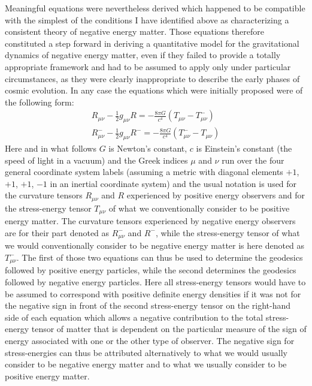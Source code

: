 \documentclass[notitlepage,12pt]{report}
\begin{document}
Meaningful equations were nevertheless derived which happened to be compatible with the simplest of the conditions I have identified above as characterizing a consistent theory of negative energy matter. Those equations therefore constituted a step forward in deriving a quantitative model for the gravitational dynamics of negative energy matter, even if they failed to provide a totally appropriate framework and had to be assumed to apply only under particular circumstances, as they were clearly inappropriate to describe the early phases of cosmic evolution. In any case the equations which were initially proposed were of the following form:
\begin{eqnarray}\label{eq:2.1}
R_{\mu\nu}-\frac{1}{2}g_{\mu\nu}R=-\frac{8\pi G}{c^4} (T_{\mu\nu}-T^-_{\mu\nu}) \\
R^-_{\mu\nu}-\frac{1}{2}g_{\mu\nu}R^-=-\frac{8\pi G}{c^4} (T^-_{\mu\nu}-T_{\mu\nu}) \nonumber
\end{eqnarray}
Here and in what follows $G$ is Newton's constant, $c$ is Einstein's constant (the speed of light in a vacuum) and the Greek indices $\mu$ and $\nu$ run over the four general coordinate system labels (assuming a metric with diagonal elements $+1$, $+1$, $+1$, $-1$ in an inertial coordinate system) and the usual notation is used for the curvature tensors $R_{\mu\nu}$ and $R$ experienced by positive energy observers and for the stress-energy tensor $T_{\mu\nu}$ of what we conventionally consider to be positive energy matter. The curvature tensors experienced by negative energy observers are for their part denoted as $R^-_{\mu\nu}$ and $R^-$, while the stress-energy tensor of what we would conventionally consider to be negative energy matter is here denoted as $T^-_{\mu\nu}$. The first of those two equations can thus be used to determine the geodesics followed by positive energy particles, while the second determines the geodesics followed by negative energy particles. Here all stress-energy tensors would have to be assumed to correspond with positive definite energy densities if it was not for the negative sign in front of the second stress-energy tensor on the right-hand side of each equation which allows a negative contribution to the total stress-energy tensor of matter that is dependent on the particular measure of the sign of energy associated with one or the other type of observer. The negative sign for stress-energies can thus be attributed alternatively to what we would usually consider to be negative energy matter and to what we usually consider to be positive energy matter.
\end{document}
